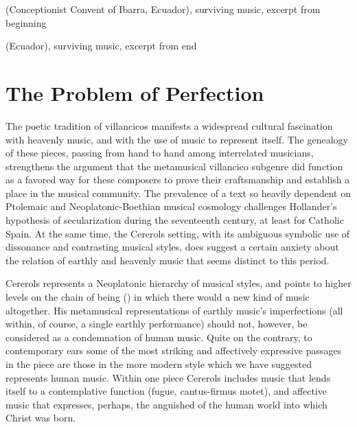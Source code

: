 { (Conceptionist Convent of Ibarra, Ecuador),
surviving music, excerpt from beginning}

{ (Ecuador), surviving music, excerpt from end}


\section{The Problem of Perfection}

The poetic tradition of  villancicos manifests a
widespread cultural fascination with heavenly music, and with the use of music
to represent itself.
The genealogy of these pieces, passing from hand to hand among interrelated
musicians, strengthens the argument that the metamusical villancico subgenre did
function as a favored way for these composers to prove their craftsmanship and
establish a place in the musical community.
The prevalence of a text so heavily dependent on Ptolemaic and
Neoplatonic-Boethian musical cosmology challenges Hollander's hypothesis of
secularization during the seventeenth century, at least for Catholic Spain.
At the same time, the Cererols setting, with its ambiguous symbolic use of
dissonance and contrasting musical styles, does suggest a certain anxiety about
the relation of earthly and heavenly music that seems distinct to this period.

Cererols represents a Neoplatonic hierarchy of musical styles, and points to
higher levels on the chain of being () in which there
would a new kind of music altogether.
His metamusical representations of earthly music's imperfections (all within, of
course, a single earthly performance) should not, however, be considered as a
condemnation of human music.
Quite on the contrary, to contemporary ears some of the most striking and
affectively expressive passages in the piece are those in the more modern
style which we have suggested represents human music.  
Within one piece Cererols includes music that lends itself to a contemplative
function (fugue, cantus-firmus motet), and affective music that expresses,
perhaps, the anguished  of the human world into which Christ was
born.

